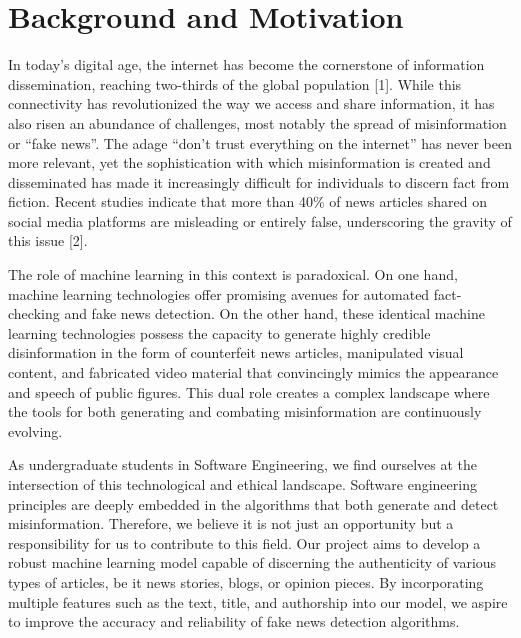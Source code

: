 \documentclass[12pt,a4paper]{article}
\begin{document}

	
	\newpage
	
	
	
	\tableofcontents
	\newpage
	\setcounter{page}{1}
	
	\section{Background and Motivation}\label{sec:intro}

	In today's digital age, the internet has become the cornerstone of information dissemination, reaching two-thirds of the global population [1]. While this connectivity has revolutionized the way we access and share information, it has also risen an abundance of challenges, most notably the spread of misinformation or ``fake news''. The adage ``don't trust everything on the internet'' has never been more relevant, yet the sophistication with which misinformation is created and disseminated has made it increasingly difficult for individuals to discern fact from fiction. Recent studies indicate that more than 40\% of news articles shared on social media platforms are misleading or entirely false, underscoring the gravity of this issue [2].

	The role of machine learning in this context is paradoxical. On one hand, machine learning technologies offer promising avenues for automated fact-checking and fake news detection. On the other hand, these identical machine learning technologies possess the capacity to generate highly credible disinformation in the form of counterfeit news articles, manipulated visual content, and fabricated video material that convincingly mimics the appearance and speech of public figures. This dual role creates a complex landscape where the tools for both generating and combating misinformation are continuously evolving.

As undergraduate students in Software Engineering, we find ourselves at the intersection of this technological and ethical landscape. Software engineering principles are deeply embedded in the algorithms that both generate and detect misinformation. Therefore, we believe it is not just an opportunity but a responsibility for us to contribute to this field. Our project aims to develop a robust machine learning model capable of discerning the authenticity of various types of articles, be it news stories, blogs, or opinion pieces. By incorporating multiple features such as the text, title, and authorship into our model, we aspire to improve the accuracy and reliability of fake news detection algorithms.
\end{document}
